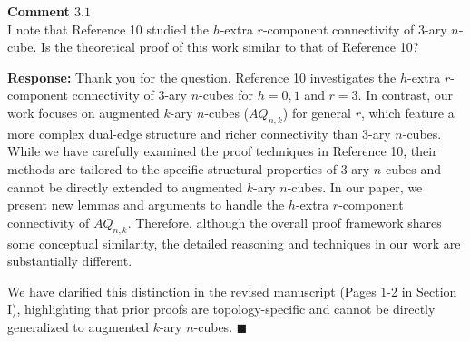 \documentclass[12pt]{article}
\begin{document}
\begin{shaded}
    \noindent \textbf{Comment $3.1$}\\
I note that Reference 10 studied the $h$-extra $r$-component connectivity of 3-ary $n$-cube. Is the theoretical proof of this work similar to that of Reference 10?
\end{shaded}
\noindent \textbf{Response:} 
Thank you for the question. Reference 10 investigates the $h$-extra $r$-component connectivity of 3-ary $n$-cubes for $h=0,1$ and $r=3$. In contrast, our work focuses on augmented $k$-ary $n$-cubes ($AQ_{n,k}$) for general $r$, which feature a more complex dual-edge structure and richer connectivity than 3-ary $n$-cubes.
While we have carefully examined the proof techniques in Reference 10, their methods are tailored to the specific structural properties of 3-ary $n$-cubes and cannot be directly extended to augmented $k$-ary $n$-cubes. In our paper, we present new lemmas and arguments to handle the $h$-extra $r$-component connectivity of $AQ_{n,k}$. Therefore, although the overall proof framework shares some conceptual similarity, the detailed reasoning and techniques in our work are substantially different.

We have clarified this distinction in the revised manuscript (Pages 1-2 in Section I), highlighting that prior proofs are topology-specific and cannot be directly generalized to augmented $k$-ary $n$-cubes.
\hfill  $\blacksquare$
\end{document}
